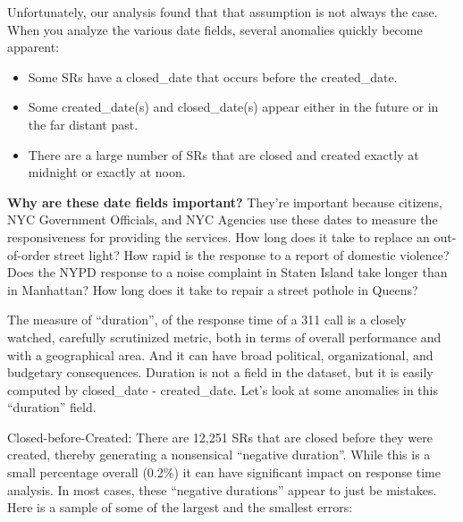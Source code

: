 \documentclass[12pt, titlepage]{article}
\begin{document}
{Unfortunately, our analysis found that that assumption is not always 
the case. When you analyze the various date fields, several anomalies 
quickly become apparent:

	\begin{itemize}
		    \item Some SRs have a closed\_date that occurs before the created\_date.
		    \item Some created\_date(s) and closed\_date(s) appear either in 
		    the future or in the far distant past.
		    \item There are a large number of SRs that are closed and created 
		    exactly at midnight or exactly at noon. 
	\end{itemize}

\textbf{Why are these date fields important?} They're important because citizens, NYC Government Officials, and NYC Agencies use these dates to measure the responsiveness 
for providing the services. How long does it take to replace an out-of-order 
street light? How rapid is the response to a report of domestic violence? 
Does the NYPD response to a noise complaint in Staten Island take longer 
than in Manhattan? How long does it take to repair a street pothole in Queens? 

The measure of ``duration'', of the response time of a 311 call is a closely 
watched, carefully scrutinized metric, both in terms of overall performance 
and with a geographical area. And it can have broad political, organizational, 
and budgetary consequences. Duration is not a field in the dataset, 
but it is easily computed by closed\_date - created\_date. Let's look at 
some anomalies in this ``duration'' field.

Closed-before-Created:  There are 12,251 SRs that are closed before they 
were created, thereby generating a nonsensical ``negative duration''. 
While this is a small percentage overall (0.2\%) it can have significant impact 
on response time analysis. In most cases, these ``negative durations'' 
appear to just be mistakes. Here is a sample of some of the 
largest and the smallest errors:

}
\end{document}
